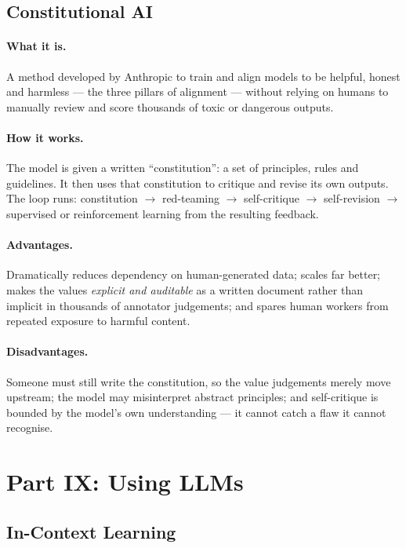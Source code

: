 \documentclass[11pt,a4paper]{article}
\begin{document}
\subsection{Constitutional AI}

\paragraph{What it is.} A method developed by Anthropic to train and align models to be
helpful, honest and harmless --- the three pillars of alignment --- without relying on humans
to manually review and score thousands of toxic or dangerous outputs.

\paragraph{How it works.} The model is given a written ``constitution'': a set of principles,
rules and guidelines. It then uses that constitution to critique and revise its own outputs.
The loop runs: constitution $\rightarrow$ red-teaming $\rightarrow$ self-critique $\rightarrow$
self-revision $\rightarrow$ supervised or reinforcement learning from the resulting feedback.

\paragraph{Advantages.} Dramatically reduces dependency on human-generated data; scales far
better; makes the values \emph{explicit and auditable} as a written document rather than
implicit in thousands of annotator judgements; and spares human workers from repeated exposure
to harmful content.

\paragraph{Disadvantages.} Someone must still write the constitution, so the value judgements
merely move upstream; the model may misinterpret abstract principles; and self-critique is
bounded by the model's own understanding --- it cannot catch a flaw it cannot recognise.

\section{Part IX: Using LLMs}

\subsection{In-Context Learning}
\end{document}
